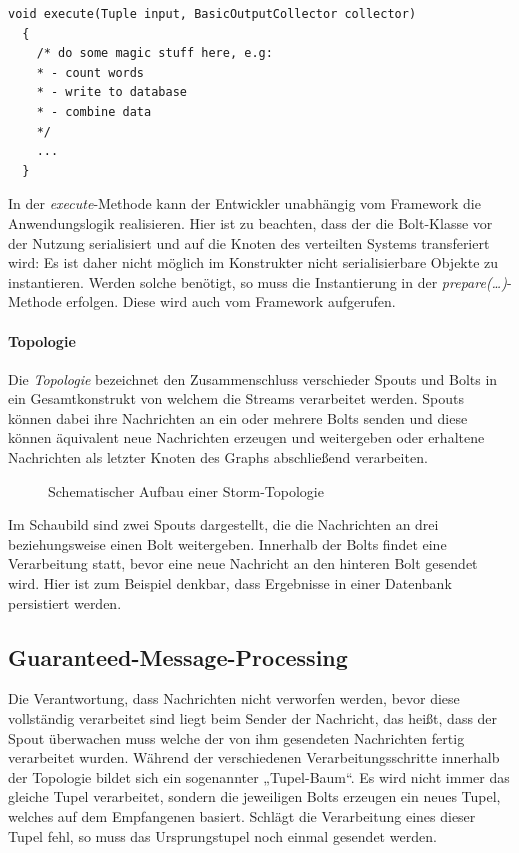 \documentclass[a4paper,11pt]{scrartcl}
\begin{document}
  \begin{lstlisting}[caption={Methodensignatur einer Bolt-Implementierung}]
  void execute(Tuple input, BasicOutputCollector collector)
  {
    /* do some magic stuff here, e.g:
    * - count words
    * - write to database
    * - combine data
    */
    ...
  }
  \end{lstlisting}

  In der \textit{execute}-Methode kann der Entwickler unabhängig vom
  Framework die Anwendungslogik realisieren. Hier ist zu beachten,
  dass der die Bolt-Klasse vor der Nutzung serialisiert und auf die
  Knoten des verteilten Systems transferiert wird: Es ist daher nicht
  möglich im Konstrukter nicht serialisierbare Objekte zu instantieren.
  Werden solche benötigt, so muss die Instantierung in der
  \textit{prepare(\ldots)}-Methode erfolgen. Diese wird auch vom
  Framework aufgerufen.

  \paragraph{Topologie}
  Die \textit{Topologie} bezeichnet den Zusammenschluss verschieder
  Spouts und Bolts in ein Gesamtkonstrukt von welchem die Streams
  verarbeitet werden. Spouts können dabei ihre Nachrichten an ein oder
  mehrere Bolts senden und diese können äquivalent neue Nachrichten
  erzeugen und weitergeben oder erhaltene Nachrichten als letzter
  Knoten des Graphs abschließend verarbeiten.

  \begin{figure}[!h]
    \center
    \scalebox{.7}{}
    \caption{Schematischer Aufbau einer Storm-Topologie}
    \label{fig:topology}
  \end{figure}

  Im Schaubild sind zwei Spouts dargestellt, die die Nachrichten an
  drei beziehungsweise einen Bolt weitergeben. Innerhalb der Bolts
  findet eine Verarbeitung statt, bevor eine neue Nachricht an den
  hinteren Bolt gesendet wird. Hier ist zum Beispiel denkbar, dass
  Ergebnisse in einer Datenbank persistiert werden.

  \subsection{Guaranteed-Message-Processing}
  Die Verantwortung, dass Nachrichten nicht verworfen werden, bevor
  diese vollständig verarbeitet sind liegt beim Sender der Nachricht,
  das heißt, dass der Spout überwachen muss welche der von ihm
  gesendeten Nachrichten fertig verarbeitet wurden. Während der
  verschiedenen Verarbeitungsschritte innerhalb der Topologie bildet
  sich ein sogenannter „Tupel-Baum“. Es wird nicht immer das gleiche
  Tupel verarbeitet, sondern die jeweiligen Bolts erzeugen ein neues
  Tupel, welches auf dem Empfangenen basiert. Schlägt die Verarbeitung
  eines dieser Tupel fehl, so muss das Ursprungstupel noch einmal
  gesendet werden.\cite{stormguaranteedprocessing}
\end{document}
